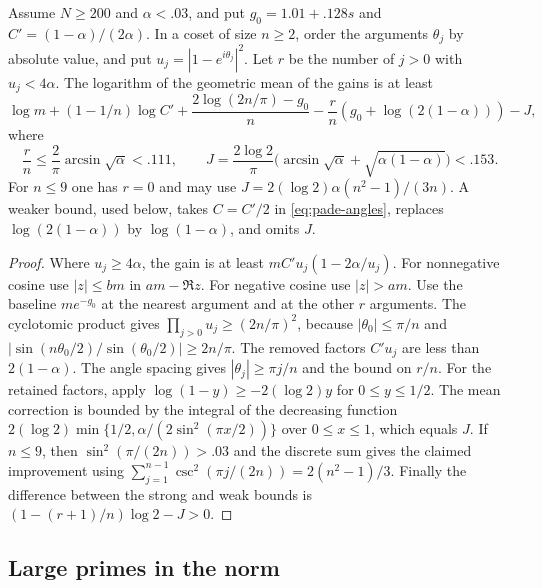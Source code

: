 \begin{lemma}\label{lem:angles}
Assume \(N\ge200\) and \(\alpha<.03\), and put
\(g_0=1.01+.128s\) and \(C'=(1-\alpha)/(2\alpha)\).
In a coset of size \(n\ge2\), order the arguments
\(\theta_j\) by absolute value, and put \(u_j=|1-e^{i\theta_j}|^2\).
Let \(r\) be the number of \(j>0\) with \(u_j<4\alpha\).
The logarithm of the geometric mean of the gains is at least
\begin{equation}\label{eq:pade-angles}
 \log m+(1-1/n)\log C'
 +\frac{2\log(2n/\pi)-g_0}{n}
 -\frac{r}{n}(g_0+\log(2(1-\alpha)))-J,
\end{equation}
where
\[
 \frac rn\le \frac2\pi\arcsin\sqrt\alpha<.111,\qquad
 J=\frac{2\log2}{\pi}
        \bigl(\arcsin\sqrt\alpha+\sqrt{\alpha(1-\alpha)}\bigr)<.153.
\]
For \(n\le9\) one has \(r=0\) and may use
\(J=2(\log2)\alpha(n^2-1)/(3n)\). A weaker bound, used below,
takes \(C=C'/2\) in \eqref{eq:pade-angles}, replaces
\(\log(2(1-\alpha))\) by \(\log(1-\alpha)\), and omits \(J\).
\end{lemma}

\begin{proof}
Where \(u_j\ge4\alpha\), the gain is at least
\(mC'u_j(1-2\alpha/u_j)\). For nonnegative cosine use
\(|z|\le bm\) in \(am-\Re z\). For negative cosine use
\(|z|>am\). Use the baseline \(me^{-g_0}\) at the nearest
argument and at the other \(r\) arguments. The cyclotomic
product gives \(\prod_{j>0}u_j\ge(2n/\pi)^2\), because
\(|\theta_0|\le\pi/n\) and
\(|\sin(n\theta_0/2)/\sin(\theta_0/2)|\ge2n/\pi\).
The removed factors \(C'u_j\) are less than \(2(1-\alpha)\).
The angle spacing gives \(|\theta_j|\ge\pi j/n\) and the
bound on \(r/n\). For the retained factors, apply
\(\log(1-y)\ge-2(\log 2)y\) for \(0\le y\le1/2\).
The mean correction is bounded by the integral of the
decreasing function
\(2(\log2)\min\{1/2,\alpha/(2\sin^2(\pi x/2))\}\) over
\(0\le x\le1\), which equals \(J\).
If \(n\le9\), then \(\sin^2(\pi/(2n))>.03\) and the
discrete sum gives the claimed improvement using
\(\sum_{j=1}^{n-1}\csc^2(\pi j/(2n))=2(n^2-1)/3\).
Finally the difference between the strong and weak bounds
is \((1-(r+1)/n)\log2-J>0\).
\end{proof}

\subsection{Large primes in the norm}

